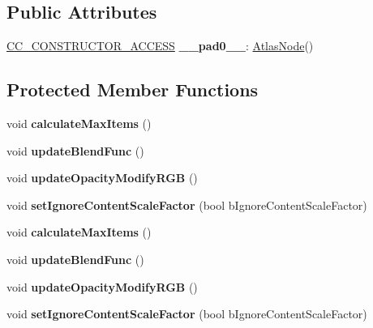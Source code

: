 \subsection*{Public Attributes}
\begin{DoxyCompactItemize}
\item 
\mbox{\label{classAtlasNode_ac28e8eb7b34abdf22420a00c5f8dfccb}} 
\hyperlink{_2cocos2d_2cocos_2base_2ccConfig_8h_a25ef1314f97c35a2ed3d029b0ead6da0}{C\+C\+\_\+\+C\+O\+N\+S\+T\+R\+U\+C\+T\+O\+R\+\_\+\+A\+C\+C\+E\+SS} {\bfseries \+\_\+\+\_\+pad0\+\_\+\+\_\+}\+: \hyperlink{classAtlasNode}{Atlas\+Node}()
\end{DoxyCompactItemize}
\subsection*{Protected Member Functions}
\begin{DoxyCompactItemize}
\item 
\mbox{\label{classAtlasNode_a29c46d0ead64797c4bb98512f82fb881}} 
void {\bfseries calculate\+Max\+Items} ()
\item 
\mbox{\label{classAtlasNode_a36799ca1a36e21352db4b253ba14804c}} 
void {\bfseries update\+Blend\+Func} ()
\item 
\mbox{\label{classAtlasNode_a7686d22e4c8a828f4ba611f1ae618f3b}} 
void {\bfseries update\+Opacity\+Modify\+R\+GB} ()
\item 
\mbox{\label{classAtlasNode_a295944af998530da5c73ba4e1c2698d0}} 
void {\bfseries set\+Ignore\+Content\+Scale\+Factor} (bool b\+Ignore\+Content\+Scale\+Factor)
\item 
\mbox{\label{classAtlasNode_a29c46d0ead64797c4bb98512f82fb881}} 
void {\bfseries calculate\+Max\+Items} ()
\item 
\mbox{\label{classAtlasNode_a36799ca1a36e21352db4b253ba14804c}} 
void {\bfseries update\+Blend\+Func} ()
\item 
\mbox{\label{classAtlasNode_a7686d22e4c8a828f4ba611f1ae618f3b}} 
void {\bfseries update\+Opacity\+Modify\+R\+GB} ()
\item 
\mbox{\label{classAtlasNode_a295944af998530da5c73ba4e1c2698d0}} 
void {\bfseries set\+Ignore\+Content\+Scale\+Factor} (bool b\+Ignore\+Content\+Scale\+Factor)
\end{DoxyCompactItemize}
